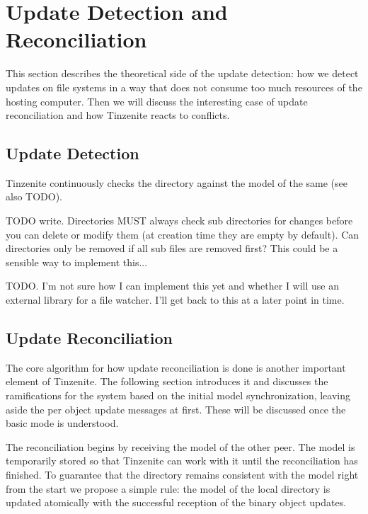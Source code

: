\section{Update Detection and Reconciliation}
\label{sec:Update Detection and Reconciliation}

This section describes the theoretical side of the update detection: how we detect updates on file systems in a way that does not consume too much resources of the hosting computer.
Then we will discuss the interesting case of update reconciliation and how Tinzenite reacts to conflicts.

\subsection{Update Detection}
\label{sub:Update Detection}

Tinzenite continuously checks the directory against the model of the same (see also TODO).

TODO write.
Directories MUST always check sub directories for changes before you can delete or modify them (at creation time they are empty by default).
Can directories only be removed if all sub files are removed first?
This could be a sensible way to implement this...

TODO.
I'm not sure how I can implement this yet and whether I will use an external library for a file watcher.
I'll get back to this at a later point in time.

\subsection{Update Reconciliation}
\label{sub:Update Reconciliation}

The core algorithm for how update reconciliation is done is another important element of Tinzenite.
The following section introduces it and discusses the ramifications for the system based on the initial model synchronization, leaving aside the per object update messages at first.
These will be discussed once the basic mode is understood.

The reconciliation begins by receiving the model of the other peer.
The model is temporarily stored so that Tinzenite can work with it until the reconciliation has finished.
To guarantee that the directory remains consistent with the model right from the start we propose a simple rule: the model of the local directory is updated atomically with the successful reception of the binary object updates.

